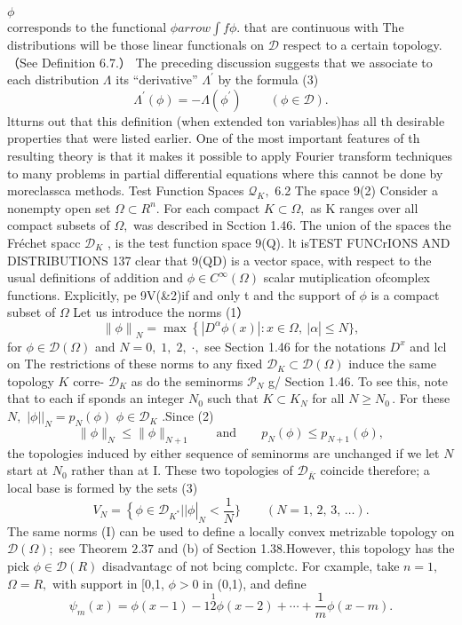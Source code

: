 $\phi~~~~~~~~~~~~~~~~~~~~~~~~~~~~~~~~~~~~~~~~~~~~~~~~~~~~~~~~~~~~~~~~~~~~~~~~~~~~~~~~~~~~~~~~~~~~~~~~~~~~~~~~~~~~~~~~~~~~~~~~~~~~~~~~~~~~~~~~~~~~~~~~~~~~~~~~~~~~~~~~~~~~~~~~~~~~~~~~~~~~~~~~~~~~~~~~~~~~~~~~~~~~~~~~~~~~~~~~~~~~~~~~~~~~~~~~~~~~~~~~~~~~~~~~~~~~~~~~~~~~~~~~~~~~~~$ corresponds to the functional $\phi arrow\textstyle\int f\phi.$ that are continuous with The distributions will be those linear functionals on ${\mathcal{D}}$ respect to a certain topology.（See Definition 6.7.） The preceding discussion suggests that we associate to each distribution $\Lambda$ its “derivative” $\Lambda^{\prime}$ by the formula (3) $$ \Lambda^{\prime}(\phi)=-\Lambda(\phi^{\prime})\;\;\;\;\;\;\;\;(\phi\in{\mathcal{D}}). $$ ltturns out that this definition (when extended ton variables)has all th desirable properties that were listed earlier. One of the most important features of th resulting theory is that it makes it possible to apply Fourier transform techniques to many problems in partial differential equations where this cannot be done by moreclassca methods. Test Function Spaces ${\mathcal{Q}}_{K},$ 6.2 The space 9(2) Consider a nonempty open set $\Omega\subset R^{n}.$ For each compact $K\subset\Omega,$ as K ranges over all compact subsets of $\Omega,$ was described in Scction 1.46. The union of the spaces the Fréchet spacc ${\mathcal{D}}_{K}$ , is the test function space 9(Q). lt isTEST FUNCrIONS AND DISTRIBUTIONS 137 clear that 9(QD) is a vector space, with respect to the usual definitions of addition and $\phi\in C^{\infty}(\Omega)$ scalar mutiplication ofcomplex functions. Explicitly, pe 9V(&2)if and only t and thc support of $\phi$ is a compact subset of $\Omega$ Let us introduce the norms (1） $$ \left\|\phi\right\|_{N}=\operatorname*{max}\left\{\left|D^{\alpha}\phi(x)\right|:x\in\Omega,\ |\alpha\right|\leq N \}, $$ for $\phi\in{\mathcal{D}}(\Omega)$ and $N=0,\;1,\;2,\;\cdot,$ see Section 1.46 for the notations $D^{x}$ and lcl on The restrictions of these norms to any fixed ${\mathcal{D}}_{K}\subset{\mathcal{D}}(\Omega)$ induce the same topology $K$ corre- ${\mathcal{D}}_{K}$ as do the seminorms ${\mathcal{P}}_{N}$ g/ Section 1.46. To see this, note that to each if sponds an integer $\textstyle{N_{0}}$ such that $K\subset K_{N}$ for all $N\geq N_{0}\,.$ For these $N,$ $|\phi||_{N}=p_{N}(\phi)$ $\phi\in{\mathcal{D}}_{K}$ .Since (2) $$ \|\phi\|_{N}\leq\|\phi\|_{N+1}\qquad\mathrm{and}\qquad p_{N}(\phi)\leq p_{N+1}(\phi), $$ the topologies induced by either sequence of seminorms are unchanged if we let $\textstyle N$ start at $N_{\mathrm{0}}$ rather than at I. These two topologies of ${\mathcal{D}}_{\bar{K}}$ coincide therefore; a local base is formed by the sets (3) $$ V_{N}=\left\{\phi\in{\mathcal{D}}_{K^{*}}\left\vert\right\vert\phi\right\vert_{N}<{\frac{1}{N}} \}\qquad(N=1,\,2,\,3,\,\ldots). $$ The same norms (I) can be used to define a locally convex metrizable topology on ${\mathcal{D}}(\Omega);$ see Theorem ${\mathsf{2.37}}$ and (b) of Section 1.38.However, this topology has the pick $\phi\in{\mathcal{D}}(R)$ disadvantagc of not bcing complctc. For cxample, take $n=1,$ $\Omega=R,$ with support in [0,1, $\phi>0$ in (0,1), and define $$ \psi_{m}(x)=\phi(x-1)-1\stackrel{1}{2}\phi(x-2)+\cdots+\frac{1}{m}\phi(x-m). $$ 
